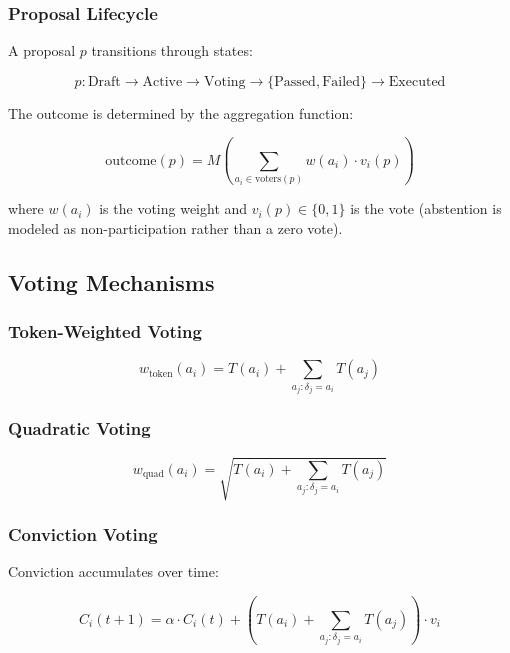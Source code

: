 \subsubsection{Proposal Lifecycle}

A proposal $p$ transitions through states:

\begin{equation}
p: \text{Draft} \rightarrow \text{Active} \rightarrow \text{Voting} \rightarrow \{\text{Passed}, \text{Failed}\} \rightarrow \text{Executed}
\end{equation}

The outcome is determined by the aggregation function:

\begin{equation}
\text{outcome}(p) = M\left(\sum_{a_i \in \text{voters}(p)} w(a_i) \cdot v_i(p)\right)
\end{equation}

where $w(a_i)$ is the voting weight and $v_i(p) \in \{0, 1\}$ is the vote (abstention is modeled as non-participation rather than a zero vote).

\subsection{Voting Mechanisms}

\subsubsection{Token-Weighted Voting}

\begin{equation}
w_{\text{token}}(a_i) = T(a_i) + \sum_{a_j: \delta_j = a_i} T(a_j)
\end{equation}

\subsubsection{Quadratic Voting}

\begin{equation}
w_{\text{quad}}(a_i) = \sqrt{T(a_i) + \sum_{a_j: \delta_j = a_i} T(a_j)}
\end{equation}

\subsubsection{Conviction Voting}

Conviction accumulates over time:

\begin{equation}
C_i(t+1) = \alpha \cdot C_i(t) + \left(T(a_i) + \sum_{a_j: \delta_j = a_i} T(a_j)\right) \cdot v_i
\end{equation}

